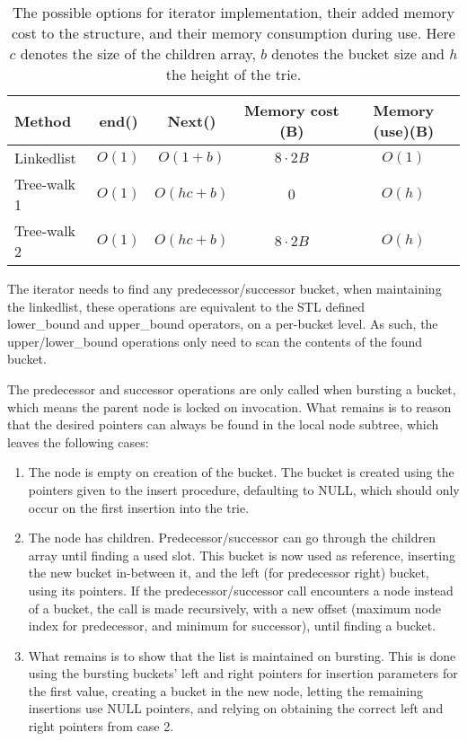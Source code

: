 \begin{table}[h!]
    \centering
    \begin{tabular}[here]{ l | c | c | c | c}
        Method      & end() & Next()      & Memory cost (B) & Memory (use)(B) \\ \hline
        Linkedlist  & $O(1)$        & $O(1 + b) $ & $8\cdot2B$      & $O(1)$ \\ \hline
        Tree-walk 1 & $O(1)$        & $O(hc + b)$ & $0$             & $O(h)$ \\ \hline
        Tree-walk 2 & $O(1)$        & $O(hc + b)$ & $8\cdot2B$      & $O(h)$ \\ \hline
    \end{tabular}
    \caption{The possible options for iterator implementation, their added memory cost
        to the structure, and their memory consumption during use. Here $c$ denotes
        the size of the children array, $b$ denotes the bucket size and $h$ the height
        of the trie.}

    \label{tab:bounds:linkedlist}
\end{table}

The iterator needs to find any predecessor/successor bucket, when maintaining
the linkedlist, these operations are equivalent to the STL defined \\lower\_bound
and upper\_bound operators, on a per-bucket level. As such, the {\keyword
upper/lower\_bound} operations only need to scan the contents of the found
bucket.

The predecessor and successor operations are only called when bursting a bucket,
which means the parent node is locked on invocation. What remains is to reason
that the desired pointers can always be found in the local node subtree,
which leaves the following cases:
\begin{enumerate}
    \item The node is empty on creation of the bucket. The bucket is
    created using the pointers given to the insert procedure, defaulting to
    {\keyword NULL}, which should only occur on the first insertion into the trie.
    \item The node has children. Predecessor/successor can go through
    the children array until finding a used slot. This bucket is now used as
    reference, inserting the new bucket in-between it, and the left (for
    predecessor right) bucket, using its pointers. If the predecessor/successor
    call encounters a node instead of a bucket, the call is made recursively,
    with a new offset (maximum node index for predecessor, and minimum for successor),
    until finding a bucket.
    \item  What remains is to show that the list is maintained on bursting.
    This is done using the bursting buckets' left and right pointers for insertion
    parameters for the first value, creating a bucket in the new node, letting the
    remaining insertions use {\keyword NULL} pointers, and relying on obtaining the
    correct left and right pointers from case 2.
\end{enumerate}

